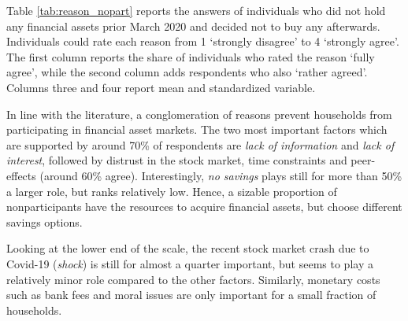 \documentclass[ProjectABM]{subfiles}
\begin{document}
Table \ref{tab:reason_nopart} reports the answers of individuals who did not hold any financial assets prior March 2020 and decided not to buy any afterwards. Individuals could rate each reason from 1 `strongly disagree' to 4 `strongly agree'. The first column reports the share of individuals who rated the reason `fully agree', while the second column adds respondents who also `rather agreed'. Columns three and four report mean and standardized variable. %

In line with the literature, a conglomeration of reasons prevent households from participating in financial asset markets. The two most important factors which are supported by around 70\% of respondents are \textit{lack of information} and \textit{lack of interest}, followed by distrust in the stock market, time constraints and peer-effects (around 60\% agree). Interestingly, \textit{no savings} plays still for more than 50\% a larger role, but ranks relatively low. Hence, a sizable proportion of nonparticipants have the resources to acquire financial assets, but choose different savings options. %


Looking at the lower end of the scale, the recent stock market crash due to Covid-19 (\textit{shock}) is still for almost a quarter important, but seems to play a relatively minor role compared to the other factors. Similarly, monetary costs such as bank fees and moral issues are only important for a small fraction of households.
\end{document}
